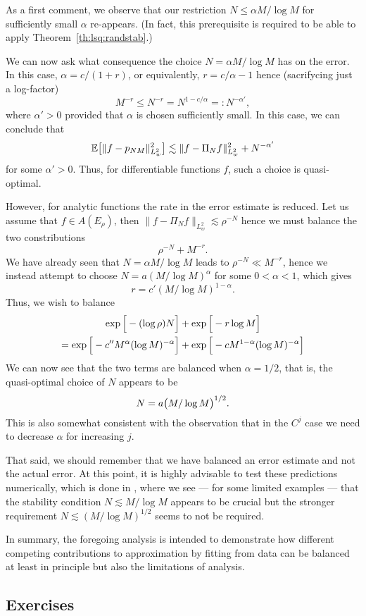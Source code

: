 As a first comment, we observe that our restriction $N \leq \alpha M / \log M$
for sufficiently small $\alpha$ re-appears. (In fact, this prerequisite is
required to be able to apply Theorem~\ref{th:lsq:randstab}.)

We can now ask what consequence the choice $N = \alpha M / \log M$ has 
on the error. In this case, $\alpha = c / (1+r)$, or equivalently, 
$r = c/\alpha - 1$ hence (sacrifycing just a log-factor)
\[
    M^{-r}  \leq N^{-r} = N^{1 - c/\alpha} =: N^{-\alpha'},
\]
where $\alpha' > 0$ provided that $\alpha$ is chosen sufficiently small. In this
case, we can conclude that 
\[
    \mathbb{E}\big[ \|f - p_{NM}\|_{L^2_w}^2 \big] 
    \lesssim  
    \|f - \Pi_N f\|_{L^2_w}^2 
    + 
    N^{- \alpha'}
\]
for some $\alpha' > 0$. Thus, for differentiable functions $f$, such a choice is
quasi-optimal. 

However, for analytic functions the rate in the error estimate is
reduced. Let us assume that $f \in A(E_\rho)$, then 
$\| f - \Pi_N f \|_{L^2_w} \lesssim \rho^{-N}$ hence we must balance the 
two constributions 
\[
    \rho^{-N} + M^{-r}.
\]
We have already seen that $N = \alpha M/\log M$ leads to $\rho^{-N} \ll M^{-r}$, 
hence we instead attempt to choose $N = a (M/\log M)^{\alpha}$ for some $0 < \alpha < 1$,
which gives 
\[
    r = c' (M / \log M)^{1-\alpha}.
\]
Thus, we wish to balance 
\begin{align*}
    \exp\Big[ - (\log \rho) N\Big]  &+ \exp\Big[ - r \log M \Big]  \\ 
    = \exp\Big[ - c'' M^\alpha (\log M)^{-\alpha} \Big]  &+ \exp\Big[ - c M^{1-\alpha} (\log M)^{-\alpha} \Big] 
\end{align*}
We can now see that the two terms are balanced when $\alpha = 1/2$, that is, 
the quasi-optimal choice of $N$ appears to be 
\[
    N = a \big(M / \log M\big)^{1/2}.
\]
This is also somewhat consistent with the observation that in the $C^j$ case we
need to decrease $\alpha$ for increasing $j$. 

That said, we should remember that we have balanced an error estimate and not
the actual error. At this point, it is highly advisable to test these
predictions numerically, which is done in \nblsq, where we see --- for some
limited examples --- that the stability condition $N \lesssim M/\log M$ appears
to be crucial but the stronger requirement $N \lesssim (M/\log M)^{1/2}$ seems
to not be required.

In summary, the foregoing analysis is intended to demonstrate how different
competing contributions to approximation by fitting from data can be balanced at
least in principle but also the limitations of analysis.





\subsection{Exercises}
%
\label{sec:lsq:exercises}
%
